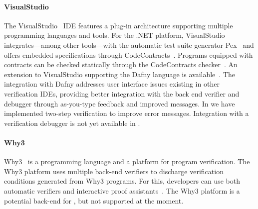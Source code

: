 \paragraph{VisualStudio}

The VisualStudio~\cite{VISUALSTUDIO} IDE features a plug-in architecture supporting multiple programming languages and tools.
For the .NET platform, VisualStudio integrates---among other tools---with the automatic test suite generator Pex~\cite{TILLMANN08} and offers embedded specifications through CodeContracts~\cite{BARNETT10}.
Programs equipped with contracts can be checked statically through the CodeContracts checker~\cite{LOGOZZO12}.
An extension to VisualStudio supporting the Dafny language is available~\cite{LEINO14}.
The integration with Dafny addresses user interface issues existing in other verification IDEs, providing better integration with the back end verifier and debugger through as-you-type feedback and improved messages.
In \AutoProof we have implemented two-step verification to improve error messages.
Integration with a verification debugger is not yet available in \AutoProof.

\paragraph{Why3}

Why3~\cite{FILLIATRE13} is a programming language and a platform for program verification.
The Why3 platform uses multiple back-end verifiers to discharge verification conditions generated from Why3 programs.
For this, developers can use both automatic verifiers and interactive proof assistants~\cite{BOBOT11}.
The Why3 platform is a potential back-end for \AutoProof, but not supported at the moment.

